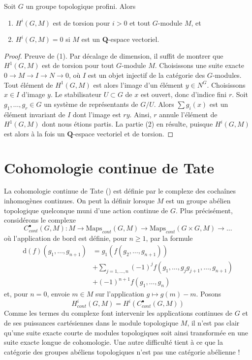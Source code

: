 \begin{lemma}
\label{lemma-profinite-group-cohomology-torsion}
Soit $G$ un groupe topologique profini.
Alors
\begin{enumerate}
\item $H^i(G, M)$ est de torsion pour $i > 0$ et tout $G$-module $M$, et
\item $H^i(G, M) = 0$ si $M$ est un $\mathbf{Q}$-espace vectoriel.
\end{enumerate}
\end{lemma}

\begin{proof}
Preuve de (1). Par d\'ecalage de dimension, il suffit
de montrer que $H^1(G, M)$ est de torsion pour tout $G$-module $M$.
Choisissons une suite exacte $0 \to M \to I \to N \to 0$, o\`u $I$
est un objet injectif de la cat\'egorie des $G$-modules.
Tout \'el\'ement de $H^1(G, M)$ est alors l'image d'un \'el\'ement
$y \in N^G$. Choisissons $x \in I$ d'image $y$.
Le stabilisateur $U \subset G$ de $x$ est ouvert, donc
d'indice fini $r$. Soit $g_1, \ldots, g_r \in G$ un syst\`eme
de repr\'esentants de $G/U$. Alors $\sum g_i(x)$ est un \'el\'ement
invariant de $I$ dont l'image est $ry$. Ainsi, $r$ annule l'\'el\'ement
de $H^1(G, M)$ dont nous \'etions partis. La partie (2) en r\'esulte, puisque
$H^i(G, M)$ est alors \`a la fois un $\mathbf{Q}$-espace vectoriel et de torsion.
\end{proof}





\section{Cohomologie continue de Tate}
\label{section-continuous-group-cohomology}

\noindent
La cohomologie continue de Tate (\cite{Tate}) est d\'efinie par le complexe des
cocha\^ines inhomog\`enes continues. On peut la d\'efinir lorsque $M$ est un
groupe ab\'elien topologique quelconque muni d'une action continue de $G$.
Plus pr\'ecis\'ement, consid\'erons le complexe
$$
C^\bullet_{cont}(G, M) :
M \to \text{Maps}_{cont}(G, M) \to
\text{Maps}_{cont}(G \times G, M) \to \ldots
$$
o\`u l'application de bord est d\'efinie, pour $n \geq 1$, par la formule
\begin{align*}
\text{d}(f)(g_1, \ldots, g_{n + 1})
& = g_1(f(g_2, \ldots, g_{n + 1})) \\
&
+ \sum\nolimits_{j = 1, \ldots, n}
(-1)^jf(g_1, \ldots, g_jg_{j + 1}, \ldots, g_{n + 1}) \\
&
+ (-1)^{n + 1}f(g_1, \ldots, g_n)
\end{align*}
et, pour $n = 0$, envoie $m \in M$ sur l'application $g \mapsto g(m) - m$. Posons
$$
H^i_{cont}(G, M) = H^i(C^\bullet_{cont}(G, M))
$$
Comme les termes du complexe font intervenir les applications continues de $G$ et
de ses puissances cart\'esiennes dans le module topologique $M$, il n'est pas clair
qu'une suite exacte courte de modules topologiques soit ainsi transform\'ee en
une suite exacte longue de cohomologie. Une autre difficult\'e tient \`a ce que la cat\'egorie
des groupes ab\'eliens topologiques n'est pas une cat\'egorie ab\'elienne !

